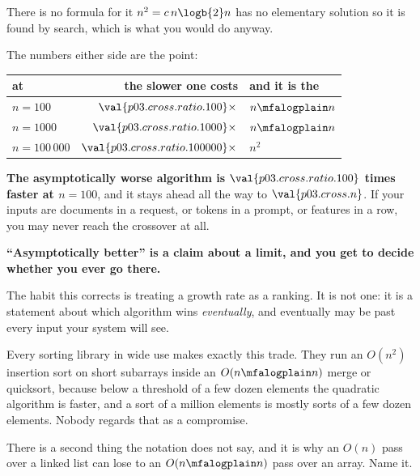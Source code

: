 \begin{fr}

There is no formula for it \dash{} $n^{2} = c\,n\logb{2} n$ has no elementary
solution \dash{} so it is found by search, which is what you would do anyway.

The numbers either side are the point:

\begin{center}
\begin{tabular}{lrl}
\toprule
at & the slower one costs & and it is the \\
\midrule
$n = 100$ & $\val{p03.cross.ratio.100}\times$ & $n \mfalogplain n$ \\
$n = 1000$ & $\val{p03.cross.ratio.1000}\times$ & $n \mfalogplain n$ \\
$n = 100\,000$ & $\val{p03.cross.ratio.100000}\times$ & $n^{2}$ \\
\bottomrule
\end{tabular}
\end{center}

\textbf{The asymptotically worse algorithm is
$\val{p03.cross.ratio.100}$ times faster at $n = 100$}, and it stays ahead all
the way to $\val{p03.cross.n}$. If your inputs
are documents in a request, or tokens in a prompt, or features in a row, you
may never reach the crossover at all.
\end{fr}


\begin{fr}
\begin{trapbox}
\textbf{\enquote{Asymptotically better} is a claim about a limit, and you get
to decide whether you ever go there.}

The habit this corrects is treating a growth rate as a ranking. It is not one:
it is a statement about which algorithm wins \emph{eventually}, and eventually
may be past every input your system will see.

Every sorting library in wide use makes exactly this trade. They run an
$O(n^{2})$ insertion sort on short subarrays inside an $O(n \mfalogplain n)$ merge or
quicksort, because below a threshold of a few dozen elements the quadratic
algorithm is faster, and a sort of a million elements is mostly sorts of a few
dozen elements. Nobody regards that as a compromise.
\end{trapbox}

There is a second thing the notation does not say, and it is why an $O(n)$
pass over a linked list can lose to an $O(n \mfalogplain n)$ pass over an array.
Name it.
\dotline
\nextframe
\end{fr}


